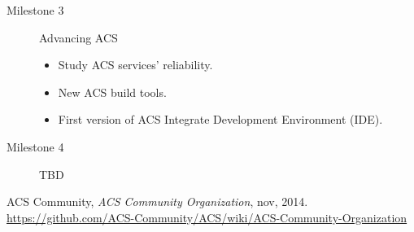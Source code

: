 \documentclass[letterpaper,11pt,twosided]{article}
\begin{document}
\begin{description}
\item[Milestone 3] Advancing ACS \hfill
\begin{itemize}
\item Study ACS services' reliability.
\item New ACS build tools.
\item First version of ACS Integrate Development Environment (IDE).
\end{itemize}

\item[Milestone 4] TBD \hfill

\end{description}

\begin{thebibliography}{9}
  ACS Community,
  \emph{ACS Community Organization},
  nov, 2014. \url{https://github.com/ACS-Community/ACS/wiki/ACS-Community-Organization}

\end{thebibliography}
\end{document}
